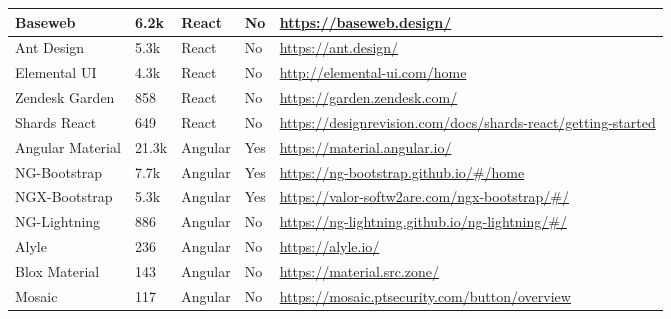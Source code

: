 \begin{table*}[t]
\begin{tabularx}{\textwidth}{l|l|l|l|X}
		Baseweb                 & 6.2k                     & React                 & No                & \url{https://baseweb.design/}                                                    \\ \hline
		Ant Design              & 5.3k                     & React                 & No                & \url{https://ant.design/}                                                        \\ \hline
		Elemental UI            & 4.3k                     & React                 & No                & \url{http://elemental-ui.com/home }                                              \\ \hline
		Zendesk Garden          & 858                      & React                 & No                & \url{https://garden.zendesk.com/}                                                \\ \hline
		Shards React            & 649                      & React                 & No                & \url{https://designrevision.com/docs/shards-react/getting-started }              \\ \hline
		Angular Material        & 21.3k                    & Angular               & Yes               & \url{https://material.angular.io/}                                               \\ \hline
		NG-Bootstrap            & 7.7k                     & Angular               & Yes               & \url{https://ng-bootstrap.github.io/\#/home }                                    \\ \hline
		NGX-Bootstrap           & 5.3k                     & Angular               & Yes               & \url{https://valor-softw2are.com/ngx-bootstrap/\#/ }                             \\ \hline
		NG-Lightning            & 886                      & Angular               & No                & \url{https://ng-lightning.github.io/ng-lightning/\#/ }                           \\ \hline
		Alyle                   & 236                      & Angular               & No                & \url{https://alyle.io/}                                                          \\ \hline
		Blox Material           & 143                      & Angular               & No                & \url{https://material.src.zone/}                                                 \\ \hline
		Mosaic                  & 117                      & Angular               & No                & \url{https://mosaic.ptsecurity.com/button/overview }                             \\ \hline

\end{tabularx}
\end{table*}
